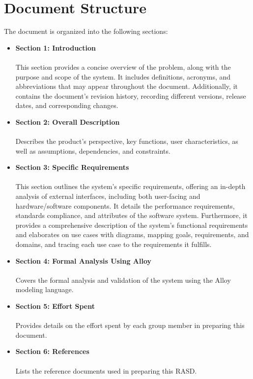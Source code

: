 \section{Document Structure}
The document is organized into the following sections:
\begin{itemize}
    \item \textbf{Section 1: Introduction} \\ \\This section provides a concise overview of the problem, along with the purpose and scope of the system. It includes definitions, acronyms, and abbreviations that may appear throughout the document. Additionally, it contains the document’s revision history, recording different versions, release dates, and corresponding changes.
    \item \textbf{Section 2: Overall Description} \\ \\ Describes the product's perspective, key functions, user characteristics, as well as assumptions, dependencies, and constraints.
    \item \textbf{Section 3: Specific Requirements} \\ \\ This section outlines the system's specific requirements, offering an in-depth analysis of external interfaces, including both user-facing and hardware/software components. It details the performance requirements, standards compliance, and attributes of the software system. Furthermore, it provides a comprehensive description of the system’s functional requirements and elaborates on use cases with diagrams, mapping goals, requirements, and domains, and tracing each use case to the requirements it fulfills.
    \item \textbf{Section 4: Formal Analysis Using Alloy} \\ \\ Covers the formal analysis and validation of the system using the Alloy modeling language.
    \item \textbf{Section 5: Effort Spent} \\ \\ Provides details on the effort spent by each group member in preparing this document.
    \item \textbf{Section 6: References} \\ \\ Lists the reference documents used in preparing this RASD.
\end{itemize}

\newpage
